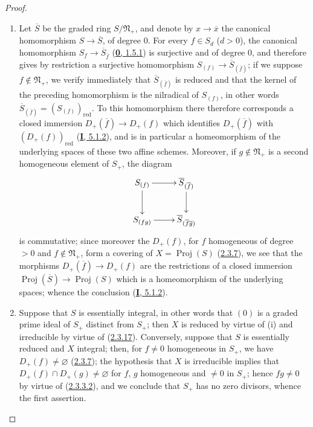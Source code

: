 \begin{proof}
\begin{enumerate}
  \item[\rm(i)] Let $\overline{S}$ be the graded ring
    $S/\mathfrak{N}_+$, and denote by $x\to\overline{x}$ the
    canonical homomorphism $S\to\overline{S}$, of degree $0$. For every
    $f\in S_d$ ($d>0$), the canonical homomorphism
    $S_f\to\overline{S}_{\overline{f}}$
    (\hyperref[0.1.5.1]{\textbf{0}, 1.5.1}) is surjective and of degree $0$, and
    therefore gives by restriction a surjective homomorphism
    $S_{(f)}\to\overline{S}_{(\overline{f})}$; if we suppose
    $f\notin\mathfrak{N}_+$, we verify immediately that
    $\overline{S}_{(\overline{f})}$ is reduced and that the kernel of
    the preceding homomorphism is the nilradical of $S_{(f)}$, in other
    words $\overline{S}_{(\overline{f})}=(S_{(f)})_{\mathrm{red}}$. To this
    homomorphism there therefore corresponds a closed immersion
    $D_+(\overline{f})\to D_+(f)$ which identifies $D_+(\overline{f})$ with
    $(D_+(f))_{\mathrm{red}}$ (\hyperref[I.5.1.2]{\textbf{I}, 5.1.2}), and is in
    particular a homeomorphism of the underlying spaces of these two
    affine schemes. Moreover, if $g\notin\mathfrak{N}_+$ is a second
    homogeneous element of $S_+$, the diagram
    \[
      \xymatrix{
        S_{(f)}\ar[r]\ar[d]
        & \overline{S}_{(\overline{f})}\ar[d]\\
        S_{(fg)}\ar[r]
        & \overline{S}_{(\overline{f}\overline{g})}
      }
    \]
    is commutative; since moreover the $D_+(f)$, for $f$ homogeneous of
    degree $>0$ and $f\notin\mathfrak{N}_+$, form a covering of
    $X=\operatorname{Proj}(S)$ (\hyperref[II.2.3.7]{2.3.7}), we see
    that the morphisms $D_+(\overline{f})\to D_+(f)$ are the restrictions
    of a closed immersion
    $\operatorname{Proj}(\overline{S})\to\operatorname{Proj}(S)$ which is
    a homeomorphism of the underlying spaces; whence the conclusion
    (\hyperref[I.5.1.2]{\textbf{I}, 5.1.2}).
  \item[\rm(ii)] Suppose that $S$ is essentially integral, in other
    words that $(0)$ is a graded prime ideal of $S_+$ distinct from $S_+$;
    then $X$ is reduced by virtue of (i) and irreducible by virtue of
    (\hyperref[II.2.3.17]{2.3.17}). Conversely, suppose that $S$ is
    essentially reduced and $X$ integral; then, for $f\neq0$ homogeneous
    in $S_+$, we have $D_+(f)\neq\varnothing$
    (\hyperref[II.2.3.7]{2.3.7}); the hypothesis that $X$ is irreducible
    implies that $D_+(f)\cap D_+(g)\neq\varnothing$ for $f$, $g$
    homogeneous and $\neq0$ in $S_+$; hence $fg\neq0$ by virtue of
    (\hyperref[II.2.3.3.2]{2.3.3.2}), and we conclude that $S_+$ has no
    zero divisors, whence the first assertion.
\end{enumerate}
\end{proof}

